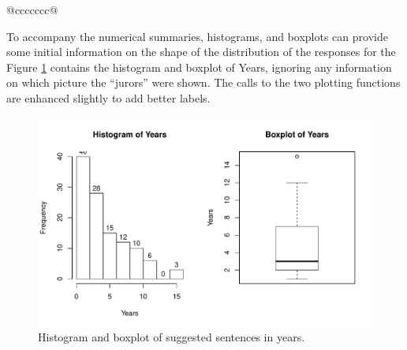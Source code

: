 \documentclass[]{book}
\newenvironment{Shaded}{\begin{snugshade}}{\end{snugshade}}
\newcommand{\KeywordTok}[1]{\textcolor[rgb]{0.13,0.29,0.53}{\textbf{#1}}}
\newcommand{\DataTypeTok}[1]{\textcolor[rgb]{0.13,0.29,0.53}{#1}}
\newcommand{\DecValTok}[1]{\textcolor[rgb]{0.00,0.00,0.81}{#1}}
\newcommand{\StringTok}[1]{\textcolor[rgb]{0.31,0.60,0.02}{#1}}
\newcommand{\OperatorTok}[1]{\textcolor[rgb]{0.81,0.36,0.00}{\textbf{#1}}}
\newcommand{\NormalTok}[1]{#1}
\theoremstyle{definition}
\theoremstyle{definition}
\theoremstyle{remark}
\begin{document}
\begin{longtable}[]{@{}ccccccc@{}}
\begin{minipage}[b]{0.10\columnwidth}
To accompany the numerical summaries, histograms, and boxplots can
provide some initial information on the shape of the distribution of the
responses for the Figure \ref{fig:Figure2-1} contains the histogram and
boxplot of Years, ignoring any information on which picture the
``jurors'' were shown. The calls to the two plotting functions are
enhanced slightly to add better labels.



\begin{figure}
\centering
\includegraphics{02-reintroductionToStatistics_files/figure-latex/Figure2-1-1.pdf}
\caption{\label{fig:Figure2-1}Histogram and boxplot of suggested sentences in years.}
\end{figure}

\begin{Shaded}
\end{Shaded}


\end{minipage}
\end{longtable}
\end{document}
